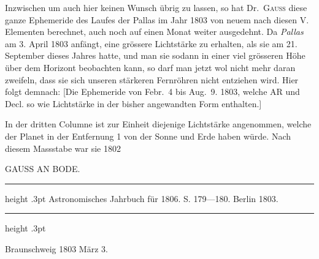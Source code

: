 Inzwischen um auch hier keinen Wunsch übrig zu lassen, so hat Dr.\ \textsc{Gauss} diese ganze Ephemeride des Laufes der Pallas im Jahr 1803 von neuem nach diesen V. Elementen berechnet, auch noch auf einen Monat weiter ausgedehnt. Da \textit{Pallas} am 3. April 1803 anfängt, eine grössere Lichtstärke zu erhalten, als sie am 21. September dieses Jahres hatte, und man sie sodann in einer viel grösseren Höhe über dem Horizont beobachten kann, so darf man jetzt wol nicht mehr daran zweifeln, dass sie sich unseren stärkeren Fernröhren nicht entziehen wird. Hier folgt demnach: [Die Ephemeride von Febr.\ 4 bis Aug.\ 9. 1803, welche AR und Decl. so wie Lichtstärke in der bisher angewandten Form enthalten.]

In der dritten Columne ist zur Einheit diejenige Lichtstärke angenommen, welche der Planet in der Entfernung 1 von der Sonne und Erde haben würde. Nach diesem Massstabe war sie 1802
\begin{center}\begingroup\fontsize{8.8}{11}\selectfont\setlength{\tabcolsep}{2.5pt}
%
\ifdim\wd0>\linewidth\resizebox{\linewidth}{!}{\usebox{0}}\else\usebox{0}\fi
\endgroup\end{center}
\begin{flushright}\end{flushright}

\par\medskip
{}
\begin{center}\large GAUSS AN BODE.\end{center}
\begin{center}\parbox{.87\linewidth}{\centering\footnotesize\frenchspacing
\hrule height .3pt\relax\vspace{2.5pt}
Astronomisches Jahrbuch für 1806. S. 179—180. Berlin 1803.\par
\vspace{2.5pt}\hrule height .3pt\relax
}\end{center}
\begin{flushright}Braunschweig 1803 März 3.\end{flushright}

